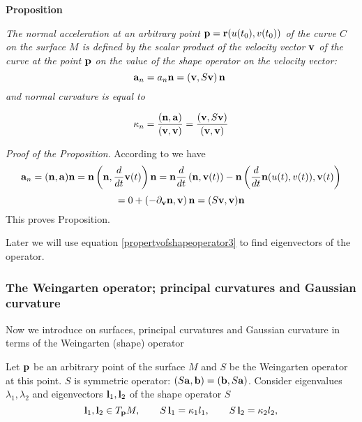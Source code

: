 \documentclass[12pt]{article}
\theoremstyle{theorem}
\numberwithin{equation}{section}
\begin{document}
{{\bigskip

  {\bf Proposition} {\it    The normal acceleration
    at an arbitrary point ${\bf p}={\bf r}(u(t_0),v(t_0))$ of the curve $C$ on the surface $M$
    is defined by the scalar product of the velocity vector ${\bf v}$ of the curve at the point ${\bf p}$
    on the value of the shape operator on the velocity vector:
\begin{equation}\label{propertyofshapeoperator2}
        {\bf a}_{n}=a_{n}{\bf n}=\left({\bf v}, S{\bf v}\right){\bf n}\
         \end{equation}
and normal curvature 
is equal to

\begin{equation}\label{propertyofshapeoperator3}
    \kappa_{n}=
{({\bf n},{\bf a})\over ({\bf v},{\bf v})}=
{\left({\bf v}, S{\bf v}\right)\over ({\bf v},{\bf v})}
\end{equation}
}

\bigskip

{\it Proof of the Proposition}.  According to 
we have
                  $$
  {\bf a}_{n}=({\bf n},{\bf a}){\bf n}={\bf n}\left({\bf n},{d\over dt}{\bf v}(t)\right){\bf n}=
     {\bf n}{d\over dt}\left({\bf n},{\bf v}(t)\right)-
     {\bf n}\left({d\over dt}{\bf n}(u(t),v(t)),{\bf v}(t)\right)
                    $$
                    $$
                    =0+\left(-\partial_{\bf v}{\bf n},{\bf v}\right){\bf n}=(S{\bf v},{\bf v}){\bf n}
                  $$
This proves Proposition.

Later we will use equation \eqref{propertyofshapeoperator3}
to find eigenvectors of the operator.
}






\subsubsection {The Weingarten operator; principal curvatures and Gaussian curvature}

Now we introduce on surfaces, principal curvatures and
Gaussian curvature in terms of the Weingarten (shape) operator

\def \bl {{\bf l}}
  Let ${\bf p}$ be an arbitrary point of the surface $M$ and $S$ be 
the Weingarten  operator at this point.
  $S$ is symmetric operator: $(S{\bf a}, {\bf b})=({\bf b}, S{\bf a})$.
  Consider
 eigenvalues $\lambda_1,\lambda_2$ and  eigenvectors $\bl_1, \bl_2$  
of the shape operator  $S$
 \begin{equation}\label{eigenvaluesofshapeoperator}
\bl_1,\bl_2\in T_\pt M,\qquad    S\,\bl_1=\kappa_1 l_1,\qquad S\,\bl_2=\kappa_2 l_2,
   \end{equation}

}
\end{document}
